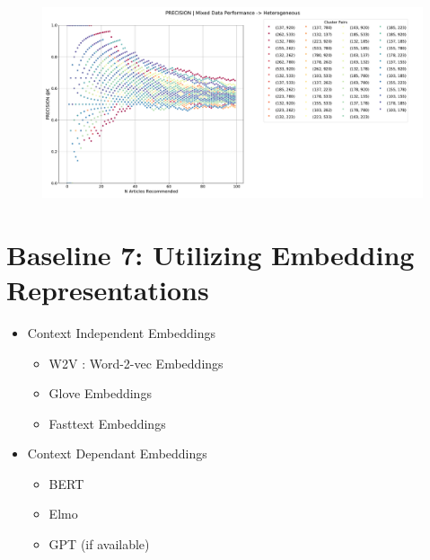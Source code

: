 \documentclass[a4paper,fontsize=9.0pt]{scrartcl}
\begin{document}
\begin{figure}[H]
 \includegraphics[width=1.0\textwidth]{Graphs/user_interaction_vs_model_performance_precision_all_cps_mixed_data_Heterogeneous.pdf}
\end{figure}

\vspace{1ex}
\section{Baseline 7: Utilizing Embedding Representations}
\begin{flushleft}
\begin{itemize}
    \item Context Independent Embeddings
    \begin{itemize}
         \item W2V : Word-2-vec Embeddings
        \item Glove Embeddings
        \item Fasttext Embeddings 
    \end{itemize}
    \item Context Dependant Embeddings
    \begin{itemize}
        \item BERT
        \item Elmo
        \item GPT (if available)
    \end{itemize}
\end{itemize}
\end{flushleft}
\end{document}
